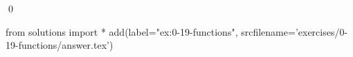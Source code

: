 
\begin{ex}
  \label{ex:0-19-functions}
  
  \qed
\end{ex}
\begin{python0}
from solutions import *
add(label="ex:0-19-functions",
    srcfilename='exercises/0-19-functions/answer.tex')
\end{python0}
